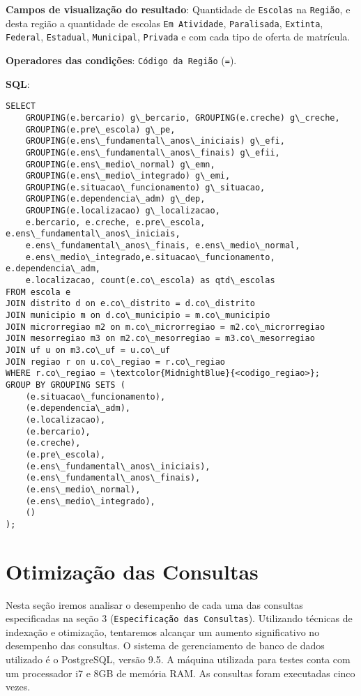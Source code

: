 \documentclass[12pt,a4paper]{article}
\begin{document}
\begin{enumerate}
        \textbf{Campos de visualização do resultado}: Quantidade de \texttt{Escolas} na \texttt{Região}, e desta região a quantidade de escolas \texttt{Em Atividade}, \texttt{Paralisada}, \texttt{Extinta}, \texttt{Federal}, \texttt{Estadual}, \texttt{Municipal}, \texttt{Privada} e com cada tipo de oferta de matrícula.
        
        \textbf{Operadores das condições}: \texttt{Código da Região} (\texttt{=}).
        
        \textbf{SQL}:
        \begin{Verbatim}[commandchars=\\\{\}]
SELECT
    GROUPING(e.bercario) g\_bercario, GROUPING(e.creche) g\_creche, 
    GROUPING(e.pre\_escola) g\_pe,
    GROUPING(e.ens\_fundamental\_anos\_iniciais) g\_efi,
    GROUPING(e.ens\_fundamental\_anos\_finais) g\_efii, 
    GROUPING(e.ens\_medio\_normal) g\_emn,
    GROUPING(e.ens\_medio\_integrado) g\_emi, 
    GROUPING(e.situacao\_funcionamento) g\_situacao,
    GROUPING(e.dependencia\_adm) g\_dep, 
    GROUPING(e.localizacao) g\_localizacao,
    e.bercario, e.creche, e.pre\_escola, e.ens\_fundamental\_anos\_iniciais,
    e.ens\_fundamental\_anos\_finais, e.ens\_medio\_normal,
    e.ens\_medio\_integrado,e.situacao\_funcionamento, e.dependencia\_adm, 
    e.localizacao, count(e.co\_escola) as qtd\_escolas
FROM escola e
JOIN distrito d on e.co\_distrito = d.co\_distrito
JOIN municipio m on d.co\_municipio = m.co\_municipio
JOIN microrregiao m2 on m.co\_microrregiao = m2.co\_microrregiao
JOIN mesorregiao m3 on m2.co\_mesorregiao = m3.co\_mesorregiao
JOIN uf u on m3.co\_uf = u.co\_uf
JOIN regiao r on u.co\_regiao = r.co\_regiao
WHERE r.co\_regiao = \textcolor{MidnightBlue}{<codigo_regiao>};
GROUP BY GROUPING SETS (
    (e.situacao\_funcionamento),
    (e.dependencia\_adm),
    (e.localizacao),
    (e.bercario),
    (e.creche),
    (e.pre\_escola),
    (e.ens\_fundamental\_anos\_iniciais),
    (e.ens\_fundamental\_anos\_finais),
    (e.ens\_medio\_normal),
    (e.ens\_medio\_integrado),
    ()
);
        \end{Verbatim}
        
\end{enumerate}


\section{Otimização das Consultas}

Nesta seção iremos analisar o desempenho de cada uma das consultas especificadas na seção 3 (\texttt{Especificação das Consultas}). Utilizando técnicas de indexação e otimização, tentaremos alcançar um aumento significativo no desempenho das consultas.
O sistema de gerenciamento de banco de dados utilizado é o PostgreSQL, versão 9.5. A máquina utilizada para testes conta com um processador i7 e 8GB de memória RAM. As consultas foram executadas cinco vezes.
\end{document}
